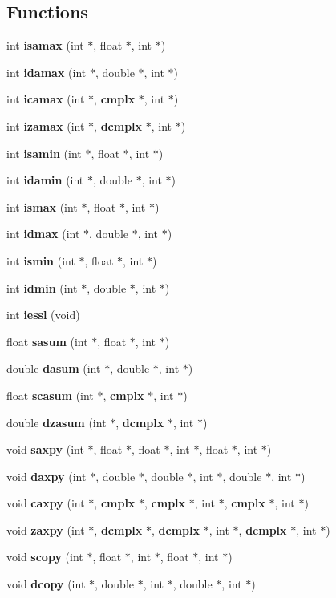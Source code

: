 \subsection*{Functions}
\begin{CompactItemize}
\item 
int {\bf isamax} (int $\ast$, float $\ast$, int $\ast$)
\item 
int {\bf idamax} (int $\ast$, double $\ast$, int $\ast$)
\item 
int {\bf icamax} (int $\ast$, {\bf cmplx} $\ast$, int $\ast$)
\item 
int {\bf izamax} (int $\ast$, {\bf dcmplx} $\ast$, int $\ast$)
\item 
int {\bf isamin} (int $\ast$, float $\ast$, int $\ast$)
\item 
int {\bf idamin} (int $\ast$, double $\ast$, int $\ast$)
\item 
int {\bf ismax} (int $\ast$, float $\ast$, int $\ast$)
\item 
int {\bf idmax} (int $\ast$, double $\ast$, int $\ast$)
\item 
int {\bf ismin} (int $\ast$, float $\ast$, int $\ast$)
\item 
int {\bf idmin} (int $\ast$, double $\ast$, int $\ast$)
\item 
int {\bf iessl} (void)
\item 
float {\bf sasum} (int $\ast$, float $\ast$, int $\ast$)
\item 
double {\bf dasum} (int $\ast$, double $\ast$, int $\ast$)
\item 
float {\bf scasum} (int $\ast$, {\bf cmplx} $\ast$, int $\ast$)
\item 
double {\bf dzasum} (int $\ast$, {\bf dcmplx} $\ast$, int $\ast$)
\item 
void {\bf saxpy} (int $\ast$, float $\ast$, float $\ast$, int $\ast$, float $\ast$, int $\ast$)
\item 
void {\bf daxpy} (int $\ast$, double $\ast$, double $\ast$, int $\ast$, double $\ast$, int $\ast$)
\item 
void {\bf caxpy} (int $\ast$, {\bf cmplx} $\ast$, {\bf cmplx} $\ast$, int $\ast$, {\bf cmplx} $\ast$, int $\ast$)
\item 
void {\bf zaxpy} (int $\ast$, {\bf dcmplx} $\ast$, {\bf dcmplx} $\ast$, int $\ast$, {\bf dcmplx} $\ast$, int $\ast$)
\item 
void {\bf scopy} (int $\ast$, float $\ast$, int $\ast$, float $\ast$, int $\ast$)
\item 
void {\bf dcopy} (int $\ast$, double $\ast$, int $\ast$, double $\ast$, int $\ast$)

\end{CompactItemize}
